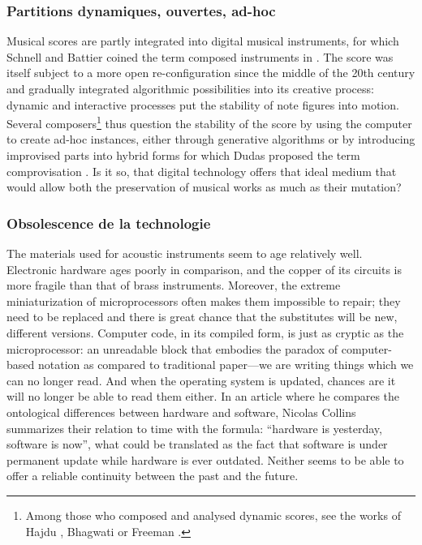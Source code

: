 \subsubsection{Partitions dynamiques, ouvertes, ad-hoc}
Musical scores are partly integrated into digital musical instruments, for which Schnell and Battier coined the term composed instruments in \cite{schnell_introducing_2002}. The score was itself subject to a more open re-configuration since the middle of the 20th century and gradually integrated algorithmic possibilities into its creative process: dynamic and interactive processes put the stability of note figures into motion. Several composers\footnote{ Among those who composed and analysed dynamic scores, see the works of Hajdu \cite{hajdu_disposable_2016}, Bhagwati \cite{bhagwati_vexations_2017} or Freeman \cite{freeman_extreme_2008}.} thus question the stability of the score by using the computer to create ad-hoc instances, either through generative algorithms or by introducing improvised parts into hybrid forms for which Dudas proposed the term comprovisation \cite{dudas_comprovisation:_2010}. Is it so, that digital technology offers that ideal medium that would allow both the preservation of musical works as much as their mutation?

\subsubsection{Obsolescence de la technologie}
The materials used for acoustic instruments seem to age relatively well. Electronic hardware ages poorly in comparison, and the copper of its circuits is more fragile than that of brass instruments. Moreover, the extreme miniaturization of microprocessors often makes them impossible to repair; they need to be replaced and there is great chance that the substitutes will be new, different versions. Computer code, in its compiled form, is just as cryptic as the microprocessor: an unreadable block that embodies the paradox of computer-based notation as compared to traditional paper—we are writing things which we can no longer read. And when the operating system is updated, chances are it will no longer be able to read them either.
	In an article where he compares the ontological differences between hardware and software, Nicolas Collins \cite{collins_semiconducting_2013} summarizes their relation to time with the formula: “hardware is yesterday, software is now”, what could be translated as the fact that software is under permanent update while hardware is ever outdated. Neither seems to be able to offer a reliable continuity between the past and the future.
	
